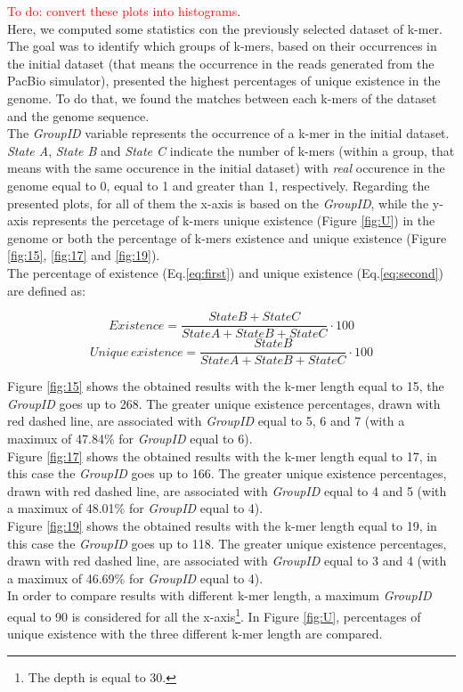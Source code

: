 \documentclass[11pt]{article}
\newcommand\myworries[1]{\textcolor{red}{#1}}
\begin{document}
\myworries{To do: convert these plots into histograms}.\\
Here, we computed some statistics con the previously selected dataset of k-mer.
The goal was to identify which groups of k-mers, based on their occurrences in the initial dataset (that means the occurrence in the reads generated from the PacBio simulator), presented the highest percentages of unique existence in the genome.
To do that, we found the matches between each k-mers of the dataset and the genome sequence.\\
The \emph{GroupID} variable represents the occurrence of a k-mer in the initial dataset. 
\emph{State A}, \emph{State B} and \emph{State C} indicate the number of k-mers (within a group, that means with the same occurence in the initial dataset) with \emph{real} occurence in the genome equal to 0, equal to 1 and greater than 1, respectively.
Regarding the presented plots, for all of them the x-axis is based on the \emph{GroupID}, while the y-axis represents the percetage of k-mers unique existence (Figure \ref{fig:U}) in the genome or both the percentage of k-mers existence and unique existence (Figure \ref{fig:15}, \ref{fig:17} and \ref{fig:19}).\\
The percentage of existence (Eq.\ref{eq:first}) and unique existence (Eq.\ref{eq:second}) are defined as:
\vspace{5mm}

\begin{equation}
Existence = \frac{State B + State C}{State A + State B + State C}\cdot 100
\label{eq:first}
\end{equation}
\begin{equation}
Unique\, existence = \frac{StateB}{StateA + StateB + StateC}\cdot 100
\label{eq:second}
\end{equation}

\vspace{6mm}
\noindent
Figure \ref{fig:15} shows the obtained results with the k-mer length equal to 15, the \emph{GroupID} goes up to 268.
The greater unique existence percentages, drawn with red dashed line, are associated with \emph{GroupID} equal to 5, 6 and 7 (with a maximux of 47.84\% for \emph{GroupID} equal to 6).\\
Figure \ref{fig:17} shows the obtained results with the k-mer length equal to 17, in this case the \emph{GroupID} goes up to 166.
The greater unique existence percentages, drawn with red dashed line, are associated with \emph{GroupID} equal to 4 and 5 (with a maximux of 48.01\% for \emph{GroupID} equal to 4).\\
Figure \ref{fig:19} shows the obtained results with the k-mer length equal to 19, in this case the \emph{GroupID} goes up to 118.
The greater unique existence percentages, drawn with red dashed line, are associated with \emph{GroupID} equal to 3 and 4 (with a maximux of 46.69\% for \emph{GroupID} equal to 4).\\
In order to compare results with different k-mer length, a maximum \emph{GroupID} equal to 90 is considered for all the x-axis\footnote{The depth is equal to 30.}.
In Figure \ref{fig:U}, percentages of unique existence with the three different k-mer length are compared.\\
\end{document}
